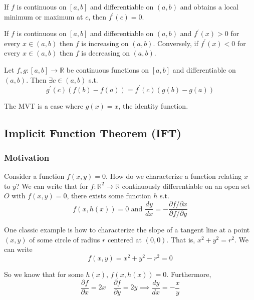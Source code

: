 \documentclass{article}
\begin{document}
\begin{corollary}
  If $f$ is continuous on $[a, b]$ and differentiable on $(a, b)$ and obtains a local minimum or maximum at $c$, then $f^\prime(c) = 0$.
\end{corollary}

\begin{corollary}
  If $f$ is continuous on $[a, b]$ and differentiable on $(a, b)$ and $f^\prime(x) > 0$ for every $x \in (a, b)$ then $f$ is increasing on $(a, b)$. Conversely, if $f^\prime(x) < 0$ for every $x \in (a, b)$ then $f$ is decreasing on $(a, b)$.
\end{corollary}

\begin{theorem}
  Let $f, g: [a, b] \to \mathbb{R}$ be continuous functions on $[a, b]$ and differentiable on $(a, b)$. Then $\exists c \in (a, b)$ s.t.
  \[
    g^\prime(c) \left(f(b) - f(a)\right)
    =
    f^\prime(c) \left(g(b) - g(a)\right)
  \]
\end{theorem}

The MVT is a case where $g(x) = x$, the identity function.

\subsection{Implicit Function Theorem (IFT)}
\label{sub:implicit_function_theorem_ift_}

\subsubsection{Motivation}
\label{ssub:motivation}

Consider a function $f(x, y) = 0$. How do we characterize a function relating $x$ to $y$? We can write that for $f: \mathbb{R}^2 \to \mathbb{R}$ continuously differentiable on an open set $O$ with $f(x, y) = 0$, there exists some function $h$ s.t.
\[
  f(x, h(x)) = 0
  \text{ and }
  \dfrac{dy}{dx} = -\dfrac{\partial f / \partial x}{\partial f / \partial y}
\]

One classic example is how to characterize the slope of a tangent line at a point $(x, y)$ of some circle of radius $r$ centered at $(0, 0)$. That is, $x^2 + y^2 = r^2$. We can write
\[
  f(x, y) = x^2 + y^2 - r^2 = 0
\]

So we know that for some $h(x)$, $f(x, h(x)) = 0$. Furthermore,
\[
  \dfrac{\partial f}{\partial x}
  = 2x
  \quad
  \dfrac{\partial f}{\partial y}
  = 2y
  \implies
  \dfrac{dy}{dx}
  = - \dfrac{x}{y}
\]
\end{document}
